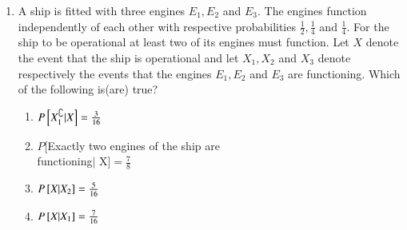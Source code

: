 \documentclass[journal,12pt,onecolumn,article]{IEEEtran}
\theoremstyle{remark}
\begin{document}
\begin{enumerate}[start=3]
\hfill{}
\begin{enumerate}
\end{enumerate}
\item A ship is fitted with three engines $E_1,E_2$ and $E_3$. The engines function independently of each other with respective probabilities $\frac{1}{2},\frac{1}{4}$ and $\frac{1}{4}$. For the ship to be operational at least two of its engines must function. Let $X$ denote the event that the ship is operational and let $X_1,X_2$ and $X_3$ denote respectively the events that the engines $E_1,E_2$ and $E_3$ are functioning. Which of the following is(are) true?
\hfill{}
\begin{enumerate}
\item $P{}\left[X_1^\complement|X\right]=\frac{3}{16}$
\item $P$[Exactly two engines of the ship are \\functioning\;$|$\; X]$=\frac{7}{8}$
\item $P{}\left[X|X_2\right]=\frac{5}{16}$
\item $P{}\left[X|X_1\right]=\frac{7}{16}$
\end{enumerate}
\end{enumerate}
\end{document}
